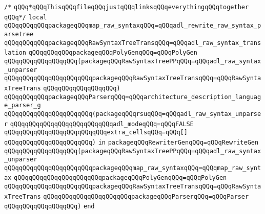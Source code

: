 \label{src/lib/compiler/back/low/tools/rewrite-generator/glue.pkg}
\verb|/*|\newline
\verb|qQQq*qQQqThisqQQqfileqQQqjustqQQqlinksqQQqeverythingqQQqtogether|\newline
\verb|qQQq*/|\newline
\newline
\verb|local|\newline
\verb|qQQqqQQqqQQqpackageqQQqmap_raw_syntaxqQQq=qQQqadl_rewrite_raw_syntax_parsetree|\newline
\newline
\verb|qQQqqQQqqQQqpackageqQQqRawSyntaxTreeTransqQQq=qQQqadl_raw_syntax_translation|\newline
\newline
\verb|qQQqqQQqqQQqpackageqQQqPolyGenqQQq=qQQqPolyGen|\newline
\verb|qQQqqQQqqQQqqQQqqQQq(packageqQQqRawSyntaxTreePPqQQq=qQQqadl_raw_syntax_unparser|\newline
\verb|qQQqqQQqqQQqqQQqqQQqqQQqpackageqQQqRawSyntaxTreeTransqQQq=qQQqRawSyntaxTreeTrans|\newline
\verb|qQQqqQQqqQQqqQQqqQQq)|\newline
\verb|qQQqqQQqqQQqpackageqQQqParserqQQq=qQQqarchitecture_description_language_parser_g|\newline
\verb|qQQqqQQqqQQqqQQqqQQqqQQq(packageqQQqrsuqQQq=qQQqadl_raw_syntax_unparser|\newline
\verb|qQQqqQQqqQQqqQQqqQQqqQQqqQQqadl_modeqQQq=qQQqFALSE|\newline
\verb|qQQqqQQqqQQqqQQqqQQqqQQqqQQqextra_cellsqQQq=qQQq[]|\newline
\verb|qQQqqQQqqQQqqQQqqQQqqQQq)|\newline
\verb|in|\newline
\newline
\verb|packageqQQqRewriterGenqQQq=qQQqRewriteGen|\newline
\verb|qQQqqQQqqQQqqQQqqQQq(packageqQQqRawSyntaxTreePPqQQq=qQQqadl_raw_syntax_unparser|\newline
\verb|qQQqqQQqqQQqqQQqqQQqqQQqpackageqQQqmap_raw_syntaxqQQq=qQQqmap_raw_syntax|\newline
\verb|qQQqqQQqqQQqqQQqqQQqqQQqpackageqQQqPolyGenqQQq=qQQqPolyGen|\newline
\verb|qQQqqQQqqQQqqQQqqQQqqQQqpackageqQQqRawSyntaxTreeTransqQQq=qQQqRawSyntaxTreeTrans|\newline
\verb|qQQqqQQqqQQqqQQqqQQqqQQqpackageqQQqParserqQQq=qQQqParser|\newline
\verb|qQQqqQQqqQQqqQQqqQQq)|\newline
\verb|end|\newline

